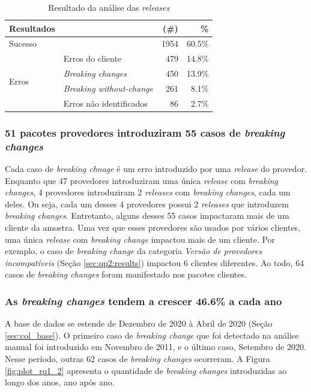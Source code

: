 \begin{table}
	\centering
	\caption{Resultado da análise das \textit{releases}}
	\begin{tabular}{llrr}
		\toprule
		\textbf{Resultados}        & \phantom{ab} &\textbf{(\#)} & \textbf{\%} \\ \hline
		Sucesso                 & \phantom{ab} & 1954         & 60.5\%      \\
		\multirow{4}{*}{Erros} 
		& Erros do cliente                 & 479 & 14.8\% \\
		& \textit{Breaking changes}        & 450 & 13.9\%  \\
		& \textit{Breaking without-change} & 261 & 8.1\%  \\
		& Erros não identificados          & 86  & 2.7\%  \\
		\bottomrule
	\end{tabular}
	\label{tab:releases_analyses}
\end{table}

\subsubsection{51 pacotes provedores introduziram 55 casos de \textit{breaking changes}}

Cada caso de \textit{breaking chnage} é um erro introduzido por uma \textit{release} do provedor. Enquanto que 47 provedores introduziram uma única \textit{release} com \textit{breaking changes}, 4 provedores introduziram 2 \textit{releases} com \textit{breaking changes}, cada um deles. Ou seja, cada um desses 4 provedores possui 2 \textit{releases} que introduzem \textit{breaking changes}. Entretanto, alguns desses 55 casos impactaram mais de um cliente da amostra. Uma vez que esses provedores são usados por vários clientes, uma única \textit{release} com \textit{breaking change} impactou mais de um cliente. Por exemplo, o caso de \textit{breaking change} da categoria \textit{Versão de provedores incompatíveis} (Seção \ref{sec:qp2:results}) impactou 6 clientes diferentes. Ao todo, 64 casos de \textit{breaking changes} foram manifestado nos pacotes clientes.

\subsubsection{As \textit{breaking changes} tendem a crescer 46.6\% a cada ano}
A base de dados se estende de Dezembro de 2020 à Abril de 2020 (Seção \ref{sec:col_base}). O primeiro caso de \textit{breaking change} que foi detectado na análise manual foi introduzido em Novembro de 2011, e o último caso, Setembro de 2020. Nesse período, outras 62 casos de \textit{breaking changes} ocorreram. A Figura \ref{fig:plot_rq1_2} apresenta o quantidade de \textit{breaking changes} introduzidas ao longo dos anos, ano após ano.

